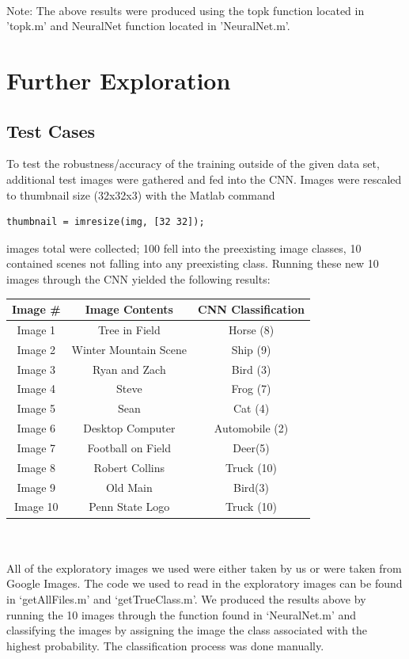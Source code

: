 \documentclass[11pt,english]{article}
\begin{document}
	~\\
	\noindent
	Note: The above results were produced using the topk function located in 'topk.m' and NeuralNet function located in 'NeuralNet.m'.

\section{Further Exploration}
\subsection{Test Cases}
To test the robustness/accuracy of the training outside of the given data set, additional test images were gathered and fed into the CNN.  Images were rescaled to thumbnail size (32x32x3) with the Matlab command
\begin{lstlisting}
thumbnail = imresize(img, [32 32]);
\end{lstlisting}
 images total were collected; 100 fell into the preexisting image classes, 10 contained scenes not falling into any preexisting class.  Running these new 10 images through the CNN yielded the following results:\\

\begin{tabular}{ | c | c | c |}
  \hline
  Image \# & Image Contents & CNN Classification \\
  \hline		
  Image 1 & Tree in Field & Horse (8) \\
  Image 2 & Winter Mountain Scene & Ship (9) \\
  Image 3 & Ryan and Zach & Bird (3) \\
  Image 4 & Steve & Frog (7) \\
  Image 5 & Sean & Cat (4) \\
  Image 6 & Desktop Computer & Automobile (2) \\
  Image 7 & Football on Field & Deer(5) \\
  Image 8 & Robert Collins & Truck (10) \\
  Image 9 & Old Main & Bird(3) \\
  Image 10 & Penn State Logo & Truck (10)\\
  \hline  
\end{tabular}

~\\~\\
\noindent
All of the exploratory images we used were either taken by us or were taken from Google Images. The code we used to read in the exploratory images can be found in `getAllFiles.m' and `getTrueClass.m'. We produced the results above by running the 10 images through the function found in `NeuralNet.m' and classifying the images by assigning the image the class associated with the highest probability. The classification process was done manually.
\end{document}
